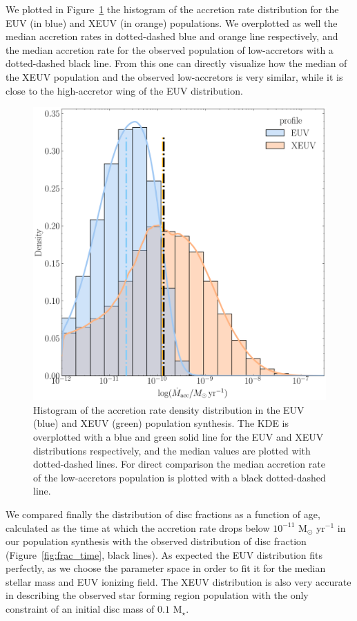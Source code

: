 \documentclass[fleqn,usenatbib,letters]{mnras}
\begin{document}
We plotted in Figure~\ref{fig:hist_mdot} the histogram of the accretion rate distribution for the EUV (in blue) and XEUV (in orange) populations. We overplotted as well the median accretion rates in dotted-dashed blue and orange line respectively, and the median accretion rate for the observed population of low-accretors with a dotted-dashed black line. From this one can directly visualize how the median of the XEUV population and the observed low-accretors is very similar, while it is close to the high-accretor wing of the EUV distribution.
\begin{figure}
    \includegraphics[width=\columnwidth]{Fig7}
    \caption{Histogram of the accretion rate density distribution in the EUV (blue) and XEUV (green) population synthesis. The KDE is overplotted with a blue and green solid line for the EUV and XEUV distributions respectively, and the median values are plotted with dotted-dashed lines. For direct comparison the median accretion rate of the low-accretors population is plotted with a black dotted-dashed line.\label{fig:hist_mdot}}
\end{figure}

We compared finally the distribution of disc fractions as a function of age, calculated as the time at which the accretion rate drops below $10^{-11}$ M$_\odot$ yr$^{-1}$ in our population synthesis with the observed distribution of disc fraction (Figure~\ref{fig:frac_time}, black lines). As expected the EUV distribution fits perfectly, as we choose the parameter space in order to fit it for the median stellar mass and EUV ionizing field. The XEUV distribution is also very accurate in describing the observed star forming region population with the only constraint of an initial disc mass of $0.1$ M$_\star$.
\end{document}
